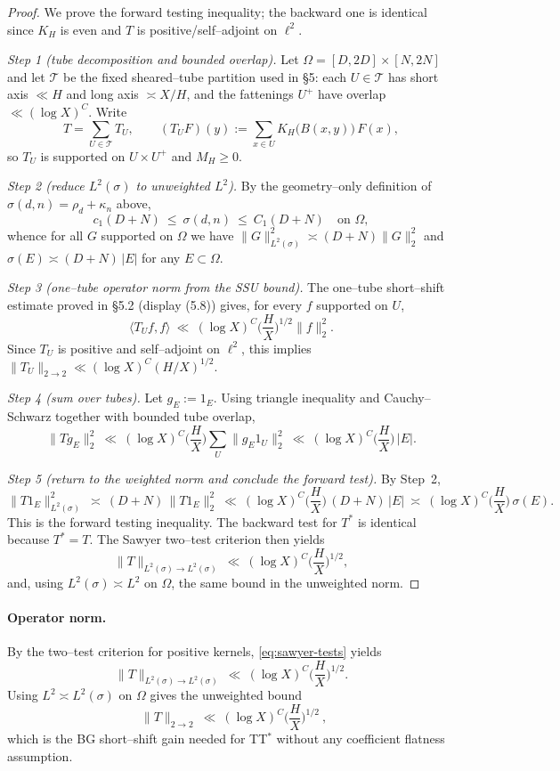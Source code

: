 \begin{proof}
We prove the forward testing inequality; the backward one is identical since $K_H$ is even and $T$ is positive/self–adjoint on $\ell^2$.

\emph{Step 1 (tube decomposition and bounded overlap).}
Let $\Omega=[D,2D]\times[N,2N]$ and let $\mathcal{T}$ be the fixed sheared–tube partition used in §5: each $U\in\mathcal{T}$ has short axis $\ll H$ and long axis $\asymp X/H$, and the fattenings $U^{+}$ have overlap $\ll(\log X)^C$. Write
\[
T=\sum_{U\in\mathcal{T}} T_U,\qquad (T_U F)(y):=\sum_{x\in U} K_H\!\big(B(x,y)\big)\,F(x),
\]
so $T_U$ is supported on $U\times U^{+}$ and $M_H\ge 0$.

\emph{Step 2 (reduce $L^2(\sigma)$ to unweighted $L^2$).}
By the geometry–only definition of $\sigma(d,n)=\rho_d+\kappa_n$ above,
\[
c_1(D+N)\ \le\ \sigma(d,n)\ \le\ C_1(D+N)\quad \text{on }\Omega,
\]
whence for all $G$ supported on $\Omega$ we have $\|G\|_{L^2(\sigma)}^2\asymp (D+N)\|G\|_2^2$ and $\sigma(E)\asymp (D+N)\,|E|$ for any $E\subset\Omega$.

\emph{Step 3 (one–tube operator norm from the SSU bound).}
The one–tube short–shift estimate proved in §5.2 (display (5.8)) gives, for every $f$ supported on $U$,
\[
\langle T_U f,f\rangle\ \ll\ (\log X)^C\Big(\frac{H}{X}\Big)^{1/2}\|f\|_2^2.
\]
Since $T_U$ is positive and self–adjoint on $\ell^2$, this implies $\|T_U\|_{2\to 2}\ll (\log X)^C(H/X)^{1/2}$.

\emph{Step 4 (sum over tubes).}
Let $g_E:=1_E$. Using triangle inequality and Cauchy–Schwarz together with bounded tube overlap,
\[
\|T g_E\|_2^2\ \ll\ (\log X)^C\Big(\frac{H}{X}\Big)\sum_U \|g_E 1_U\|_2^2
\ \ll\ (\log X)^C\Big(\frac{H}{X}\Big)\,|E|.
\]

\emph{Step 5 (return to the weighted norm and conclude the forward test).}
By Step~2,
\[
\|T1_E\|_{L^2(\sigma)}^2\ \asymp\ (D+N)\,\|T1_E\|_2^2
\ \ll\ (\log X)^C\Big(\frac{H}{X}\Big)\,(D+N)\,|E|
\ \asymp\ (\log X)^C\Big(\frac{H}{X}\Big)\,\sigma(E).
\]
This is the forward testing inequality. The backward test for $T^\ast$ is identical because $T^\ast=T$. The Sawyer two–test criterion then yields
\[
\|T\|_{L^2(\sigma)\to L^2(\sigma)}\ \ll\ (\log X)^C\Big(\frac{H}{X}\Big)^{1/2},
\]
and, using $L^2(\sigma)\asymp L^2$ on $\Omega$, the same bound in the unweighted norm.
\end{proof}

\paragraph{Operator norm.}
By the two–test criterion for positive kernels, \eqref{eq:sawyer-tests} yields
\[
\|T\|_{L^2(\sigma)\to L^2(\sigma)} \ \ll\  (\log X)^C\Big(\frac{H}{X}\Big)^{1/2}.
\]
Using $L^2\!\asymp L^2(\sigma)$ on $\Omega$ gives the unweighted bound
\[
\boxed{\ \ \|T\|_{2\to 2} \ \ll\  (\log X)^C\Big(\frac{H}{X}\Big)^{1/2}\ }\!,
\]
which is the BG short–shift gain needed for TT$^\ast$ without any coefficient flatness assumption.



